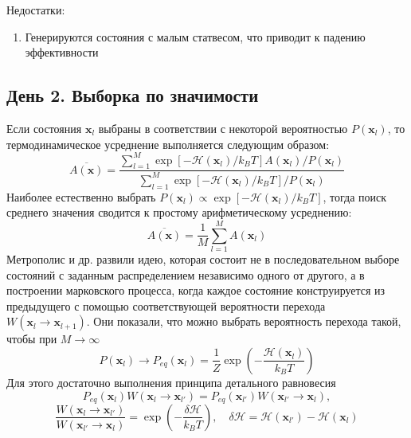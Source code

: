 \documentclass[article]{ncc}
\renewcommand{\vec}[1]{\boldsymbol{#1}}
\begin{document}
Недостатки:
\begin{enumerate}
    \item Генерируются состояния с малым статвесом, что приводит к падению эффективности
\end{enumerate}

\subsection{День 2. Выборка по значимости}

Если состояния \(\vec{x}_l\) выбраны в соответствии с некоторой вероятностью \(P(\vec{x}_l)\), то термодинамическое усреднение выполняется следующим образом:
\begin{equation}
\overline{A(\vec{x})}=\frac{\sum\limits_{l=1}^{M} \exp[-\mathcal{H}(\vec{x}_l)/k_BT]A(\vec{x}_l)/P(\vec{x}_l)}
                              {\sum\limits_{l=1}^{M} \exp[-\mathcal{H}(\vec{x}_l)/k_BT]/P(\vec{x}_l)}
\end{equation}
Наиболее естественно выбрать \( P(\vec{x}_l) \propto \exp[-\mathcal{H}(\vec{x}_l)/k_BT] \), тогда поиск среднего значения сводится к простому арифметическому усреднению:
\begin{equation}
    \overline{A(\vec{x})} = \frac{1}{M}\sum_{l=1}^M A(\vec{x}_l)
\end{equation}
Метрополис и др. развили идею, которая состоит не в последовательном выборе состояний с заданным распределением независимо одного от другого, а в построении марковского процесса, когда каждое состояние конструируется из предыдущего с помощью соответствующей вероятности перехода \( W(\vec{x}_l \to \vec{x}_{l+1}) \). Они показали, что можно выбрать вероятность перехода такой, чтобы при \(M\to\infty\)
\begin{equation}
    P(\vec{x}_l) \to P_{eq}(\vec{x}_l) = \frac{1}{Z}\exp\left(-\frac{\mathcal{H}(\vec{x}_l)}{k_BT}\right)
\end{equation}
Для этого достаточно выполнения принципа детального равновесия
\begin{equation}
    P_{eq}(\vec{x}_l)W(\vec{x}_l \to \vec{x}_{l'}) = P_{eq}(\vec{x}_{l'})W(\vec{x}_{l'} \to \vec{x}_l),
\end{equation}
\begin{equation}
    \frac{W(\vec{x}_l \to \vec{x}_{l'})}{W(\vec{x}_{l'} \to \vec{x}_l)} = \exp\left(-\frac{\delta\mathcal{H}}{k_BT}\right),\quad \delta\mathcal{H} = \mathcal{H}(\vec{x}_{l'}) - \mathcal{H}(\vec{x}_l)
    \label{eq:equilibrium_ratio}
\end{equation}
\end{document}
